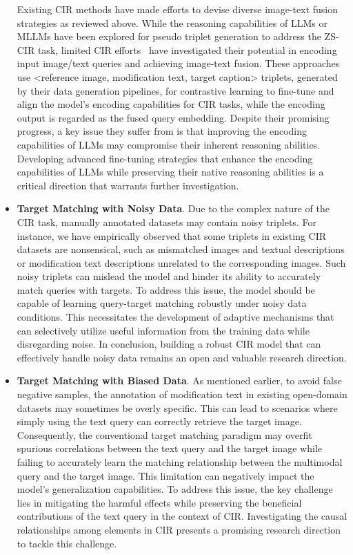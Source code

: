 \begin{itemize}
    Existing CIR methods have made efforts to devise diverse image-text fusion strategies as reviewed above. While the reasoning capabilities of LLMs or MLLMs have been explored for pseudo triplet generation to address the ZS-CIR task, limited CIR efforts~\cite{zhong2024compositional,mcl} have investigated their potential in encoding input image/text queries and achieving image-text fusion. 
    These approaches use <reference image, modification text, target caption> triplets, generated by their data generation pipelines, for contrastive learning to fine-tune and align the model's encoding capabilities for CIR tasks, while the encoding output is regarded as the fused query embedding. 
    Despite their promising progress, a key issue they suffer from is that improving the encoding capabilities of LLMs may compromise their inherent reasoning abilities. Developing advanced fine-tuning strategies that enhance the encoding capabilities of LLMs while preserving their native reasoning abilities is a critical direction that warrants further investigation.
    \item \textbf{Target Matching with Noisy Data}. 
    Due to the complex nature of the CIR task, manually annotated datasets may contain noisy triplets. For instance, we have empirically observed that some triplets in existing CIR datasets are nonsensical, such as mismatched images and textual descriptions or modification text descriptions unrelated to the corresponding images. Such noisy triplets can mislead the model and hinder its ability to accurately match queries with targets. To address this issue, the model should be capable of learning query-target matching robustly under noisy data conditions. This necessitates the development of adaptive mechanisms that can selectively utilize useful information from the training data while disregarding noise. In conclusion, building a robust CIR model that can effectively handle noisy data remains an open and valuable research direction.
    \item \textbf{Target Matching with Biased Data}. As mentioned earlier, to avoid false negative samples, the annotation of modification text in existing open-domain datasets may sometimes be overly specific. This can lead to scenarios where simply using the text query can correctly retrieve the target image. Consequently, the conventional target matching paradigm may overfit spurious correlations between the text query and the target image while failing to accurately learn the matching relationship between the multimodal query and the target image. This limitation can negatively impact the model's generalization capabilities. To address this issue, the key challenge lies in mitigating the harmful effects while preserving the beneficial contributions of the text query in the context of CIR. Investigating the causal relationships among elements in CIR presents a promising research direction to tackle this challenge.

\end{itemize}
